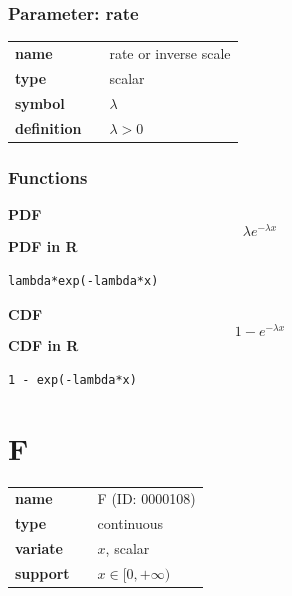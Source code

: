 \documentclass{article}
\begin{document}
\subsubsection*{Parameter: rate}

\noindent\begin{tabular}{p{2cm}cl}
\textbf{name} & & rate or inverse scale \\
\textbf{type} & & scalar \\
\textbf{symbol} & & $\lambda$  \\
\textbf{definition} & & $\lambda > 0$
\end{tabular}
\subsubsection*{Functions}

\smallskip \noindent \hspace{.2cm} \textbf{PDF} 
\begin{equation*}\lambda e^{-\lambda x}\end{equation*}
\smallskip \noindent \hspace{.2cm} \textbf{PDF in R}  
\begin{verbatim}lambda*exp(-lambda*x)\end{verbatim}
\smallskip \noindent \hspace{.2cm} \textbf{CDF} 
\begin{equation*}1 - e^{-\lambda x}\end{equation*}
\smallskip \noindent \hspace{.2cm} \textbf{CDF in R} 
\begin{verbatim}1 - exp(-lambda*x)\end{verbatim}
\smallskip\section*{F} 

  \bigskip 

\begin{tabular}{p{2cm}cl}
\textbf{name} & & F (ID: 0000108)\\ 
 
\textbf{type} & & continuous \\ 

\textbf{variate} & & $x$, scalar \\ 

\textbf{support} & & $x \in [0,+\infty)$
\end{tabular}
\end{document}
